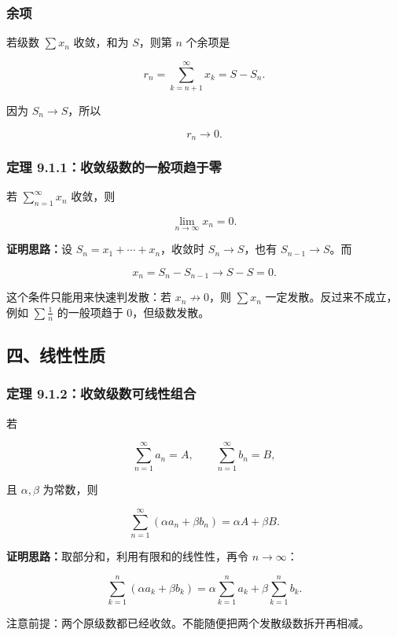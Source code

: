 \subsubsection*{余项}

若级数 \(\sum x_n\) 收敛，和为 \(S\)，则第 \(n\) 个余项是

\[
      r_n=\sum_{k=n+1}^{\infty}x_k=S-S_n.
    \]

因为 \(S_n\to S\)，所以

\[
      r_n\to0.
    \]

\subsubsection*{定理 9.1.1：收敛级数的一般项趋于零}

若 \(\sum_{n=1}^{\infty}x_n\) 收敛，则

\[
      \lim_{n\to\infty}x_n=0.
    \]

\textbf{证明思路：}设 \(S_n=x_1+\cdots+x_n\)，收敛时 \(S_n\to S\)，也有 \(S_{n-1}\to S\)。而

\[
      x_n=S_n-S_{n-1}\to S-S=0.
    \]

\begin{notebox}
这个条件只能用来快速判发散：若 \(x_n\not\to0\)，则 \(\sum x_n\) 一定发散。反过来不成立，例如 \(\sum\frac1n\) 的一般项趋于 \(0\)，但级数发散。
\end{notebox}

\subsection*{四、线性性质}

\subsubsection*{定理 9.1.2：收敛级数可线性组合}

若

\[
      \sum_{n=1}^{\infty}a_n=A,\qquad
      \sum_{n=1}^{\infty}b_n=B,
    \]

且 \(\alpha,\beta\) 为常数，则

\[
      \sum_{n=1}^{\infty}(\alpha a_n+\beta b_n)
      =
      \alpha A+\beta B.
    \]

\textbf{证明思路：}取部分和，利用有限和的线性性，再令 \(n\to\infty\)：

\[
      \sum_{k=1}^{n}(\alpha a_k+\beta b_k)
      =
      \alpha\sum_{k=1}^{n}a_k+\beta\sum_{k=1}^{n}b_k.
    \]

\begin{notebox}
注意前提：两个原级数都已经收敛。不能随便把两个发散级数拆开再相减。
\end{notebox}

